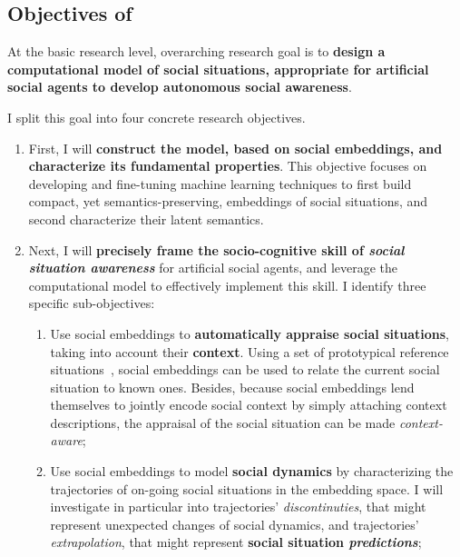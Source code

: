 \subsection{Objectives of \project}
\label{sec:objectives}

\begin{framed}
\noindent At the basic research level, \project overarching research
goal is to \textbf{design a computational model of social situations,
appropriate for artificial social agents to develop autonomous social awareness}.
\end{framed}

I split this goal into four concrete research objectives.

\begin{enumerate}[label=\textbf{O\arabic*}]
    \item \label{_O1} First, I will \textbf{construct the \project model, based
        on social embeddings, and characterize its fundamental properties}.
        This objective focuses on developing and fine-tuning machine learning
        techniques to first build compact, yet semantics-preserving, embeddings
        of social situations, and second characterize their latent semantics. 

    \item \label{_O2} Next, I will \textbf{precisely frame the socio-cognitive skill of
        \emph{social situation awareness}} for artificial social agents, and leverage the \project
        computational model to effectively implement this skill.
        I identify three specific sub-objectives:

    \begin{enumerate}[label=\textbf{O2.\arabic*}]
        \item \label{O2.1} Use social embeddings to \textbf{automatically appraise
            social situations}, taking into account their \textbf{context}. Using
            a set of prototypical reference situations~\cite{kelley2003atlas}, social embeddings
            can be used to relate the current social situation to known ones.
            Besides, because social embeddings lend themselves to jointly encode
            social context by simply attaching context descriptions, the appraisal
            of the social situation can be made \emph{context-aware};

        \item \label{O2.2} Use social embeddings to model \textbf{social
            dynamics} by characterizing the trajectories of on-going social situations in the
            embedding space. I will investigate in particular into trajectories'
            \emph{discontinuties}, that might represent unexpected changes of social
            dynamics, and trajectories' \emph{extrapolation}, that might represent
            \textbf{social situation \emph{predictions}};


\end{enumerate}
\end{enumerate}
